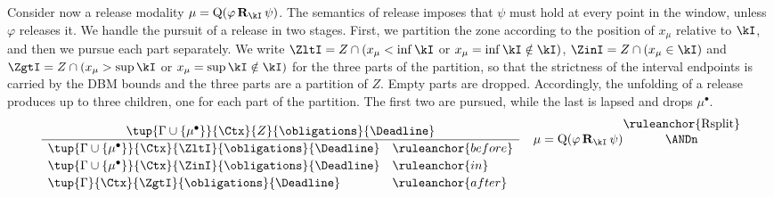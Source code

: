 Consider now a release modality $\mu=\mathrm{Q}(\varphi\,\mathbf{R}_\kI\,\psi)$. The semantics of release imposes that $\psi$ must hold at every point in the window, unless $\varphi$ releases it. We handle the pursuit of a release in two stages. First, we partition the zone according to the position of $x_\mu$ relative to $\kI$, and then we pursue each part separately. We write $\ZltI = Z\cap(x_\mu<\inf\kI$ or $ x_\mu=\inf\kI\notin\kI)$, $\ZinI = Z\cap(x_\mu\in\kI)$ and $\ZgtI = Z\cap(x_\mu>\sup\kI$ or $ x_\mu=\sup\kI\notin\kI)$ for the three parts of the partition,
%
%
%
so that the strictness of the interval endpoints is carried by the DBM bounds and the three parts are a partition of $Z$. Empty parts are dropped. Accordingly, the unfolding of a release produces up to three children, one for each part of the partition. The first two are pursued, while the last is lapsed and drops $\mu^\bullet$.
\[
\frac{\tup{\Gamma\cup\{\mu^\bullet\}}{\Ctx}{Z}{\obligations}{\Deadline}}
{\begin{array}{lll}
\tup{\Gamma\cup\{\mu^\bullet\}}{\Ctx}{\ZltI}{\obligations}{\Deadline} & \ruleanchor{before}\\[2pt]
\tup{\Gamma\cup\{\mu^\bullet\}}{\Ctx}{\ZinI}{\obligations}{\Deadline} & \ruleanchor{in}\\[2pt]
\tup{\Gamma}{\Ctx}{\ZgtI}{\obligations}{\Deadline} & \ruleanchor{after}
\end{array}}
\quad \mu=\mathrm{Q}(\varphi\,\mathbf{R}_\kI\,\psi)
\shortstack{\ruleanchor{Rsplit}\\\ANDn}
\]

